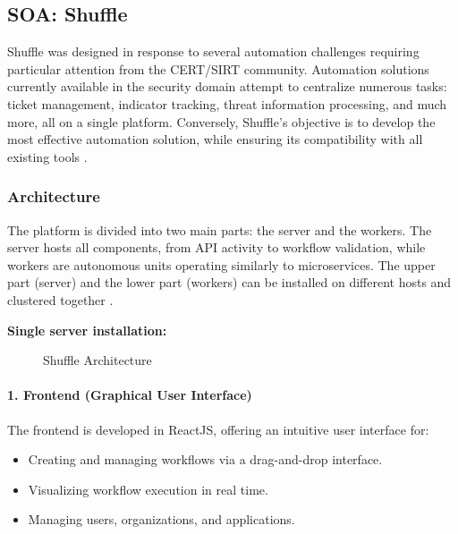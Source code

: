 \subsection{SOA: Shuffle}
\label{subsec:shuffle}

Shuffle was designed in response to several automation challenges requiring particular attention from the CERT/SIRT community. Automation solutions currently available in the security domain attempt to centralize numerous tasks: ticket management, indicator tracking, threat information processing, and much more, all on a single platform. Conversely, Shuffle's objective is to develop the most effective automation solution, while ensuring its compatibility with all existing tools \cite{shuffle-docs}.

\subsubsection{Architecture}
\label{subsubsec:shuffle-arch}

The platform is divided into two main parts: the server and the workers. The server hosts all components, from API activity to workflow validation, while workers are autonomous units operating similarly to microservices. The upper part (server) and the lower part (workers) can be installed on different hosts and clustered together \cite{shuffle-arch}.

\textbf{Single server installation:}

\begin{figure}[H]
\centering
{}
\caption{Shuffle Architecture}
\label{fig:shuffle-arch}
\end{figure}

\paragraph{1. Frontend (Graphical User Interface)}
\label{par:shuffle-frontend}

The frontend is developed in ReactJS, offering an intuitive user interface for:
\begin{itemize}
    \item Creating and managing workflows via a drag-and-drop interface.
    \item Visualizing workflow execution in real time.
    \item Managing users, organizations, and applications.
\end{itemize}

